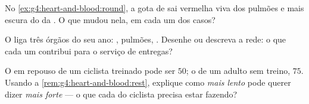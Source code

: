 \begin{exercise}[$\star\star$]\label{exo:g4:heart-and-blood:9}
No \cref{ex:g4:heart-and-blood:round}, a gota de  sai vermelha
viva dos pulmões e mais escura do  da . O que mudou
nela, em cada um dos casos?
\end{exercise}

\begin{exercise}[$\star\star$]\label{exo:g4:heart-and-blood:10}
O  liga três órgãos do seu ano: , pulmões,
. Desenhe ou descreva a rede: o que cada um contribui para o
serviço de entregas?
\end{exercise}

\begin{exercise}[$\star\star\star$]\label{exo:g4:heart-and-blood:11}
O  em repouso de um ciclista treinado pode ser $50$; o de um
adulto sem treino, $75$. Usando a
\cref{rem:g4:heart-and-blood:rest}, explique como \emph{mais lento}
pode querer dizer \emph{mais forte} --- o que cada  do ciclista
precisa estar fazendo?
\end{exercise}
